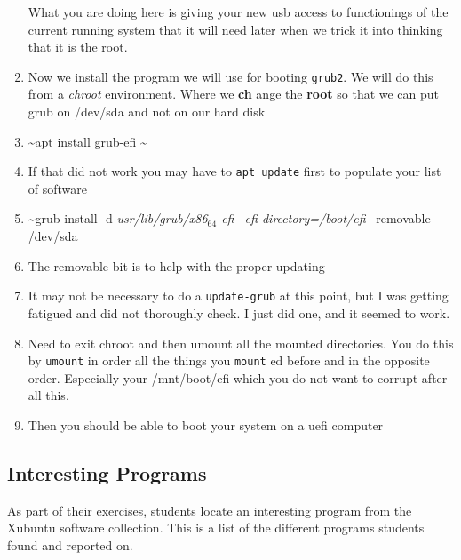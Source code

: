 \documentclass{article}
\begin{document}
\begin{enumerate}
What you are doing here is giving your new usb access to functionings of the current running system that it will need later when we trick it into thinking that it is the root.
\item Now we install the program we will use for booting \texttt{grub2}. We will do this from a \emph{chroot} environment. Where we \textbf{ch} ange the \textbf{root} so that we can put grub on /dev/sda and not on our hard disk
\item \textasciitilde{}apt install grub-efi \textasciitilde{}
\item If that did not work you may have to \texttt{apt update} first to populate your list of software
\item \textasciitilde{}grub-install -d \emph{usr/lib/grub/x86\(_{\text{64}}\)-efi --efi-directory=/boot/efi} --removable /dev/sda
\item The removable bit is to help with the proper updating
\item It may not be necessary to do a \texttt{update-grub} at this point, but I was getting fatigued and did not thoroughly check. I just did one, and it seemed to work.
\item Need to exit chroot and then umount all the mounted directories. You do this by \texttt{umount} in order all the things you \texttt{mount} ed before and in the opposite order. Especially your /mnt/boot/efi which you do not want to corrupt after all this.
\item Then you should be able to boot your system on a uefi computer
\end{enumerate}
\subsection{Interesting Programs}
\label{sec:org0f946a4}
As part of their exercises, students locate an interesting program from the Xubuntu software collection. This is a list of the different programs students found and reported on.
\end{document}
